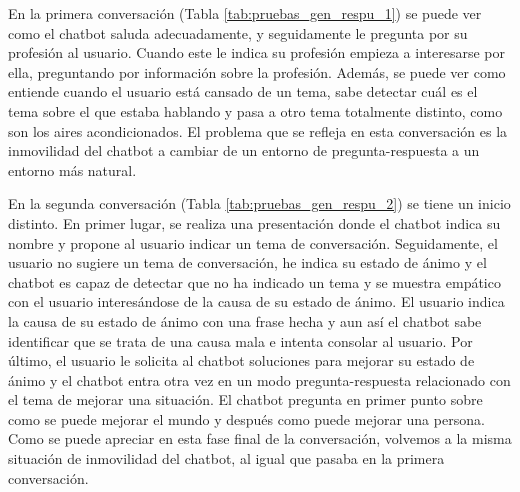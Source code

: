 En la primera conversación (Tabla \ref{tab:pruebas_gen_respu_1}) se puede ver como el chatbot saluda adecuadamente, y seguidamente le pregunta por su profesión al usuario. Cuando este le indica su profesión empieza a interesarse por ella, preguntando por información sobre la profesión. Además, se puede ver como entiende cuando el usuario está cansado de un tema, sabe detectar cuál es el tema sobre el que estaba hablando y pasa a otro tema totalmente distinto, como son los aires acondicionados. El problema que se refleja en esta conversación es la inmovilidad del chatbot a cambiar de un entorno de pregunta-respuesta a un entorno más natural.

En la segunda conversación (Tabla \ref{tab:pruebas_gen_respu_2}) se tiene un inicio distinto. En primer lugar, se realiza una presentación donde el chatbot indica su nombre y propone al usuario indicar un tema de conversación. Seguidamente, el usuario no sugiere un tema de conversación, he indica su estado de ánimo y el chatbot es capaz de detectar que no ha indicado un tema y se muestra empático con el usuario interesándose de la causa de su estado de ánimo. El usuario indica la causa de su estado de ánimo con una frase hecha y aun así el chatbot sabe identificar que se trata de una causa mala e intenta consolar al usuario. Por último, el usuario le solicita al chatbot soluciones para mejorar su estado de ánimo y el chatbot entra otra vez en un modo pregunta-respuesta relacionado con el tema de mejorar una situación. El chatbot pregunta en primer punto sobre como se puede mejorar el mundo y después como puede mejorar una persona. Como se puede apreciar en esta fase final de la conversación, volvemos a la misma situación de inmovilidad del chatbot, al igual que pasaba en la primera conversación.


